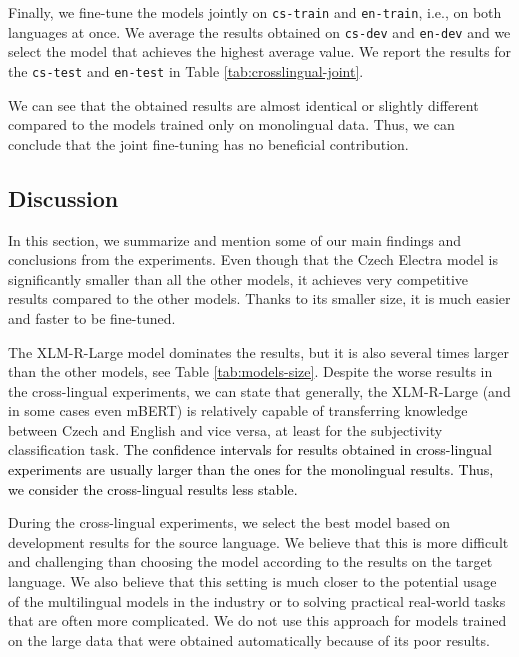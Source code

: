 \documentclass[10pt, a4paper]{article}
\begin{document}
\par Finally, we fine-tune the models jointly on \texttt{cs-train} and \texttt{en-train}, i.e., on both languages at once. We average the results obtained on \texttt{cs-dev} and \texttt{en-dev} and we select the model that achieves the highest average value. We report the results for the \texttt{cs-test} and \texttt{en-test} in Table \ref{tab:crosslingual-joint}.

\par We can see that the obtained results are almost identical or slightly different compared to the models trained only on monolingual data. Thus, we can conclude that the joint fine-tuning has no beneficial contribution.


\subsection{Discussion}
In this section, we summarize and mention some of our main findings and conclusions from the experiments. Even though that the Czech Electra model is significantly smaller than all the other models, it achieves very competitive results compared to the other models. Thanks to its smaller size, it is much easier and faster to be fine-tuned. 

\par The XLM-R-Large model dominates the results, but it is also several times larger than the other models, see Table \ref{tab:models-size}. Despite the worse results in the cross-lingual experiments, we can state that generally, the XLM-R-Large (and in some cases even mBERT) is relatively capable of transferring knowledge between Czech and English and vice versa, at least for the subjectivity classification task.
\textcolor{black}{The confidence intervals for results obtained in cross-lingual experiments are usually larger than the ones for the monolingual results. Thus, we consider the cross-lingual results less stable.}

\par During the cross-lingual experiments, we select the best model based on development results for the source language. We believe that this is more difficult and challenging than choosing the model according to the results on the target language. We also believe that this setting is much closer to the potential usage of the multilingual models in the industry or to solving practical real-world tasks that are often more complicated. We do not use this approach for models trained on the large data that were obtained automatically because of its poor results.
\end{document}
